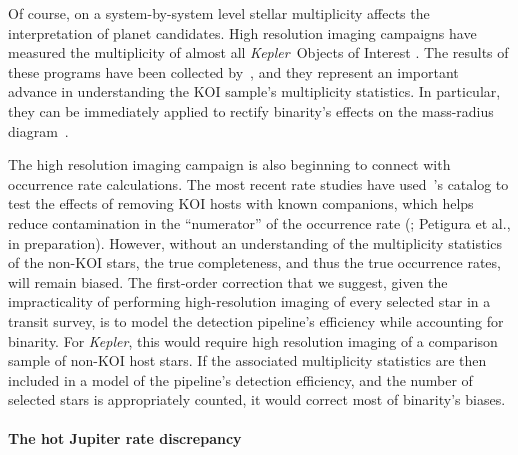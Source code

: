 \documentclass[12pt,modern]{aastex61}
\begin{document}
Of course, on a system-by-system level stellar multiplicity affects the 
interpretation of planet candidates. High resolution imaging 
campaigns have measured the multiplicity of almost all {\it Kepler}\ Objects 
of Interest 
\citep{howell_speckle_2011,adams_adaptive_2012,adams_adaptive_2013,horch_observations_2012,
    horch_most_2014,lillo-box_multiplicity_2012,lillo-box_high-resolution_2014,dressing_adaptive_2014,
    law_robotic_2014,cartier_revision_2015,everett_high-resolution_2015,gilliland_hubble_2015,
    wang_influence_2015,wang_influence_2015-1,baranec_robo-ao_2016}.
The results of these programs have been collected 
by~\citet{furlan_kepler_2017}, and they represent an important advance in 
understanding the KOI 
sample's multiplicity statistics.
In particular, they can be immediately applied to rectify binarity's effects 
on the mass-radius diagram~\citep{furlan_densities_2017}.

The high resolution imaging campaign is also beginning to connect with
occurrence rate calculations.
The most recent rate studies have used~\citet{furlan_kepler_2017}'s 
catalog to test the effects of removing KOI hosts with known companions, which 
helps reduce contamination in the ``numerator'' of 
the occurrence rate (\citealt{fulton_california-_2017}; Petigura et al.,
in preparation).
However, without an understanding of the multiplicity statistics of the 
non-KOI stars, the true completeness, and thus the true 
occurrence rates, will remain biased.
The first-order correction that we suggest, given the impracticality of 
performing high-resolution imaging of every selected star in a transit survey,
is to model the detection pipeline's efficiency while accounting for 
binarity.
For {\it Kepler}, this would require high resolution imaging of a
comparison sample of non-KOI host stars. If the associated multiplicity 
statistics are then included in a model of the pipeline's detection 
efficiency, and the number of selected stars is appropriately counted, it 
would correct most of binarity's biases.


\paragraph{The hot Jupiter rate discrepancy}
\end{document}
